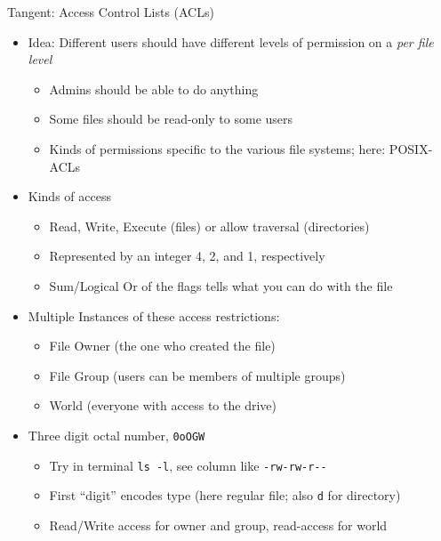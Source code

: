 \begin{frame}{Tangent: Access Control Lists (ACLs)}
%
\begin{itemize}
\item Idea: Different users should have different levels of permission on a \emph{per file level}
	\begin{itemize}
	\item Admins should be able to do anything
	\item Some files should be read-only to some users
	\item Kinds of permissions specific to the various file systems; here: POSIX-ACLs
	\end{itemize}
\item Kinds of access
	\begin{itemize}
	\item Read, Write, Execute (files) or allow traversal (directories)
	\item Represented by an integer 4, 2, and 1, respectively
	\item[\Thus] Sum/Logical Or of the flags tells what you can do with the file
	\end{itemize}
\item Multiple Instances of these access restrictions:
	\begin{itemize}
	\item File Owner (the one who created the file)
	\item File Group (users can be members of multiple groups)
	\item World (everyone with access to the drive)
	\end{itemize}
\item[\Thus] Three digit octal number, \texttt{0oOGW}
	\begin{itemize}
	\item Try in terminal \texttt{ls -l}, see column like \texttt{-rw-rw-r-{}-}
	\item First \enquote{digit} encodes type (here regular file; also \texttt{d} for directory)
	\item Read/Write access for owner and group, read-access for world
	\end{itemize}
\end{itemize}
%
\end{frame}


